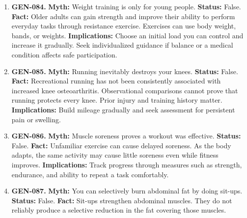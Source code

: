 \documentclass[11pt,oneside]{book}
\begin{document}
\begin{enumerate}[leftmargin=0pt,labelwidth=0pt,labelsep=0pt,itemindent=0pt]
\textbf{Status:} False.\newline
\textbf{Fact:} For uncomplicated low-back pain, continuing tolerable everyday activity usually supports recovery. Prolonged bed rest can increase stiffness and reduce conditioning. \cite{ref250}\newline
\textbf{Implications:} Briefly modify activities that aggravate symptoms and return to them gradually as tolerated.
\item[] \textbf{GEN-084.} \textbf{Myth:} Weight training is only for young people.\newline
\textbf{Status:} False.\newline
\textbf{Fact:} Older adults can gain strength and improve their ability to perform everyday tasks through resistance exercise. Exercises can use body weight, bands, or weights. \cite{ref318}\newline
\textbf{Implications:} Choose an initial load you can control and increase it gradually. Seek individualized guidance if balance or a medical condition affects safe participation.
\item[] \textbf{GEN-085.} \textbf{Myth:} Running inevitably destroys your knees.\newline
\textbf{Status:} False.\newline
\textbf{Fact:} Recreational running has not been consistently associated with increased knee osteoarthritis. Observational comparisons cannot prove that running protects every knee. Prior injury and training history matter. \cite{ref251}\newline
\textbf{Implications:} Build mileage gradually and seek assessment for persistent pain or swelling.
\item[] \textbf{GEN-086.} \textbf{Myth:} Muscle soreness proves a workout was effective.\newline
\textbf{Status:} False.\newline
\textbf{Fact:} Unfamiliar exercise can cause delayed soreness. As the body adapts, the same activity may cause little soreness even while fitness improves. \cite{ref193}\newline
\textbf{Implications:} Track progress through measures such as strength, endurance, and ability to repeat a task comfortably.
\item[] \textbf{GEN-087.} \textbf{Myth:} You can selectively burn abdominal fat by doing sit-ups.\newline
\textbf{Status:} False.\newline
\textbf{Fact:} Sit-ups strengthen abdominal muscles. They do not reliably produce a selective reduction in the fat covering those muscles. \cite{ref305}\newline

\end{enumerate}
\end{document}

